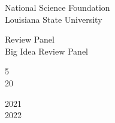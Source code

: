 \documentclass[10pt]{designcv}
\begin{document}

\clearpage


\begin{minipage}[t]{0.35\textwidth}
National Science Foundation\\
Louisiana State University\\
\end{minipage}
\hfill
\begin{minipage}[t]{0.3\textwidth}
Review Panel\\
Big Idea Review Panel\\
\end{minipage}
\hfill
\begin{minipage}[t]{0.1\textwidth}
5\\
20\\
\end{minipage}
\hfill
\begin{minipage}[t]{0.15\textwidth}
2021\\
2022\\
\end{minipage}


\end{document}

